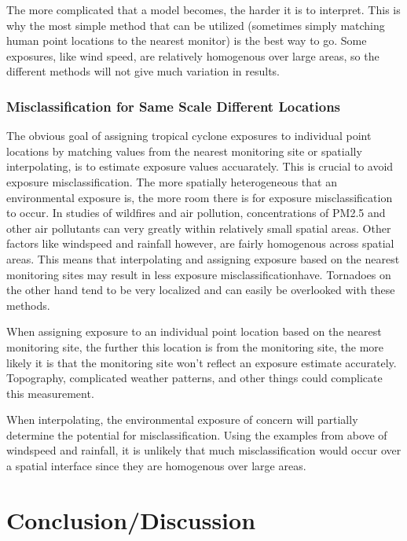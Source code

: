 \documentclass[
]{article}
\begin{document}
The more complicated that a model becomes, the harder it is to
interpret. This is why the most simple method that can be utilized
(sometimes simply matching human point locations to the nearest monitor)
is the best way to go. Some exposures, like wind speed, are relatively
homogenous over large areas, so the different methods will not give much
variation in results.

\hypertarget{misclassification-for-same-scale-different-locations}{%
\subsubsection{Misclassification for Same Scale Different
Locations}\label{misclassification-for-same-scale-different-locations}}

The obvious goal of assigning tropical cyclone exposures to individual
point locations by matching values from the nearest monitoring site or
spatially interpolating, is to estimate exposure values accuarately.
This is crucial to avoid exposure misclassification. The more spatially
heterogeneous that an environmental exposure is, the more room there is
for exposure misclassification to occur. In studies of wildfires and air
pollution, concentrations of PM2.5 and other air pollutants can very
greatly within relatively small spatial areas. Other factors like
windspeed and rainfall however, are fairly homogenous across spatial
areas. This means that interpolating and assigning exposure based on the
nearest monitoring sites may result in less exposure
misclassificationhave. Tornadoes on the other hand tend to be very
localized and can easily be overlooked with these methods.

When assigning exposure to an individual point location based on the
nearest monitoring site, the further this location is from the
monitoring site, the more likely it is that the monitoring site won't
reflect an exposure estimate accurately. Topography, complicated weather
patterns, and other things could complicate this measurement.

When interpolating, the environmental exposure of concern will partially
determine the potential for misclassification. Using the examples from
above of windspeed and rainfall, it is unlikely that much
misclassification would occur over a spatial interface since they are
homogenous over large areas.

\hypertarget{conclusiondiscussion}{%
\section{Conclusion/Discussion}\label{conclusiondiscussion}}
\end{document}
